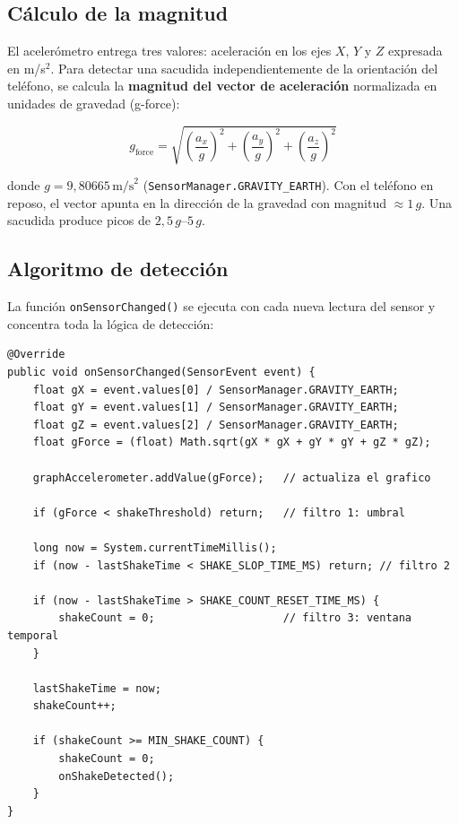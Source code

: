 \documentclass[12pt, a4paper]{article}
\begin{document}
\subsection{C\'alculo de la magnitud}

El aceler\'ometro entrega tres valores: aceleraci\'on en los ejes $X$, $Y$ y
$Z$ expresada en m/s$^2$. Para detectar una sacudida independientemente de la
orientaci\'on del tel\'efono, se calcula la \textbf{magnitud del vector de
aceleraci\'on} normalizada en unidades de gravedad (g-force):

\[
  g_{\text{force}} =
    \sqrt{
      \left(\frac{a_x}{g}\right)^2 +
      \left(\frac{a_y}{g}\right)^2 +
      \left(\frac{a_z}{g}\right)^2
    }
\]

donde $g = 9{,}80665\,\text{m/s}^2$ (\texttt{SensorManager.GRAVITY\_EARTH}).
Con el tel\'efono en reposo, el vector apunta en la direcci\'on de la gravedad
con magnitud $\approx 1\,g$. Una sacudida produce picos de $2{,}5\,g$--$5\,g$.

\subsection{Algoritmo de detecci\'on}

La funci\'on \texttt{onSensorChanged()} se ejecuta con cada nueva lectura del
sensor y concentra toda la l\'ogica de detecci\'on:

\begin{lstlisting}[caption={Detecci\'on de sacudida en tiempo real --- \texttt{MainActivity.java}}]
@Override
public void onSensorChanged(SensorEvent event) {
    float gX = event.values[0] / SensorManager.GRAVITY_EARTH;
    float gY = event.values[1] / SensorManager.GRAVITY_EARTH;
    float gZ = event.values[2] / SensorManager.GRAVITY_EARTH;
    float gForce = (float) Math.sqrt(gX * gX + gY * gY + gZ * gZ);

    graphAccelerometer.addValue(gForce);   // actualiza el grafico

    if (gForce < shakeThreshold) return;   // filtro 1: umbral

    long now = System.currentTimeMillis();
    if (now - lastShakeTime < SHAKE_SLOP_TIME_MS) return; // filtro 2

    if (now - lastShakeTime > SHAKE_COUNT_RESET_TIME_MS) {
        shakeCount = 0;                    // filtro 3: ventana temporal
    }

    lastShakeTime = now;
    shakeCount++;

    if (shakeCount >= MIN_SHAKE_COUNT) {
        shakeCount = 0;
        onShakeDetected();
    }
}
\end{lstlisting}
\end{document}
